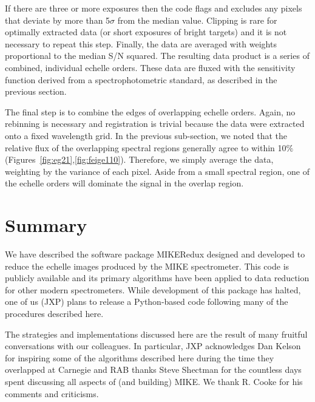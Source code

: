 \documentclass[12pt,preprint]{aastex}
\begin{document}
If there are three or more exposures then the code flags and excludes
any pixels that deviate by more than 5$\sigma$ from the median value.
Clipping is rare for optimally extracted data (or short exposures of bright
targets) and it is not necessary to repeat this step.
Finally, the data are averaged with weights proportional to 
the median S/N squared.
The resulting data product is a series of combined, individual echelle
orders.  These data are fluxed with the sensitivity function derived
from a spectrophotometric standard, as described in the previous section.

The final step is to combine the edges of overlapping echelle orders.
Again, no rebinning is necessary and registration is trivial because
the data were extracted onto a fixed wavelength grid.
In the previous sub-section, we noted that the relative flux of the
overlapping spectral regions generally agree to within 10$\%$
(Figures~\ref{fig:eg21},\ref{fig:feige110}).  Therefore, we simply 
average the data, weighting by the variance of each pixel.
Aside from a small spectral region, one of the echelle orders will
dominate the signal in the overlap region.

\section{Summary}

We have described the software package MIKERedux designed and
developed to reduce the echelle images produced by the MIKE
spectrometer.  This code is publicly available and its primary
algorithms have been applied to data reduction for
other modern spectrometers.   While development of this package has
halted, one of us (JXP) plans to release a Python-based code following
many of the procedures described here.

\acknowledgments
The strategies and implementations discussed here are the result 
of many fruitful conversations with our colleagues.  In particular, 
JXP acknowledges Dan Kelson for inspiring some of the algorithms
described here during the time they overlapped at Carnegie and RAB
thanks Steve Shectman for the countless days spent discussing all
aspects of (and building) MIKE.  We thank R. Cooke for his 
comments and criticisms.


\clearpage 
%
%
\end{document}
